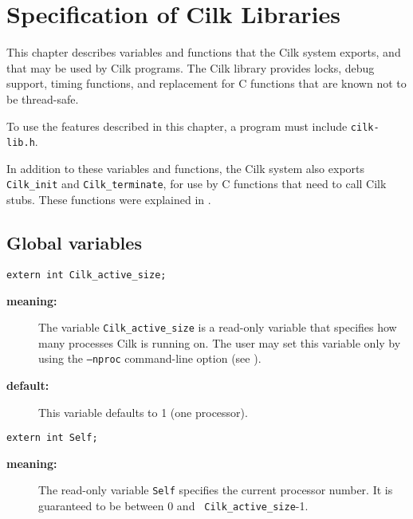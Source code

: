 
\chapter{Specification of Cilk Libraries}
\label{chap:libref}

This chapter describes variables and functions that the Cilk system
exports, and that may be used by Cilk programs.  The Cilk library
provides locks, debug support, timing functions, and replacement for C
functions that are known not to be thread-safe.

To use the features described in this chapter, a program must include
\texttt{cilk-lib.h}.

In addition to these variables and functions, the Cilk system also
exports \texttt{Cilk\_init} and \texttt{Cilk\_terminate}, for use
by C functions that need to call Cilk stubs. These functions were
explained in .

\section{Global variables}
\label{sec:variables}
\begin{verbatim}
extern int Cilk_active_size;
\end{verbatim}
\begin{description}
\item[{\bf meaning:}]  The variable \texttt{Cilk\_active\_size} is a
read-only variable that specifies how many processes  Cilk is running
on.  The user may set this variable only by using the \texttt{--nproc}
command-line option (see ).

\item[{\bf default:}]  This variable defaults to 1 (one processor).
\end{description}

\begin{verbatim}
extern int Self;
\end{verbatim}
\begin{description}
\item[{\bf meaning:}]  The read-only variable \texttt{Self} specifies the
current processor number.  It is guaranteed to be between 0 and {\tt
Cilk\_active\_size}-1.
\end{description}

